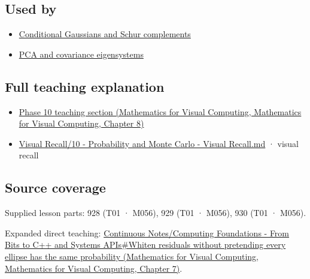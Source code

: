 \subsection{Used by}\label{appendix-12bbe185dbe5-used-by}

\begin{itemize}
\tightlist
\item
  \hyperref[appendix-f0437ea55a47]{Conditional Gaussians and Schur complements}
\item
  \hyperref[appendix-ad175ef3c5bf]{PCA and covariance eigensystems}
\end{itemize}

\subsection{Full teaching explanation}\label{appendix-12bbe185dbe5-full-teaching-explanation}

\begin{itemize}
\tightlist
\item
  \href{../02-Mathematics-for-Visual-Computing/main.pdf\#nameddest=02-foundations-ii-ch024-waiting-times-event-counts-and-covariance-geometry}{Phase 10 teaching section (Mathematics for Visual Computing, Mathematics for Visual Computing, Chapter 8)}
\item
  \hyperref[appendix-cb5af353ef77]{Visual Recall/10 - Probability and Monte Carlo - Visual Recall.md} · visual recall
\end{itemize}

\subsection{Source coverage}\label{appendix-12bbe185dbe5-source-coverage}

Supplied lesson parts: 928 (T01 · M056), 929 (T01 · M056), 930 (T01 · M056).

Expanded direct teaching: \href{../02-Mathematics-for-Visual-Computing/main.pdf\#nameddest=02-foundations-ii-ch023-whiten-residuals-without-pretending-every-ellipse-has-the-same-probability}{Continuous Notes/Computing Foundations - From Bits to C++ and Systems APIs\#Whiten residuals without pretending every ellipse has the same probability (Mathematics for Visual Computing, Mathematics for Visual Computing, Chapter 7)}.
